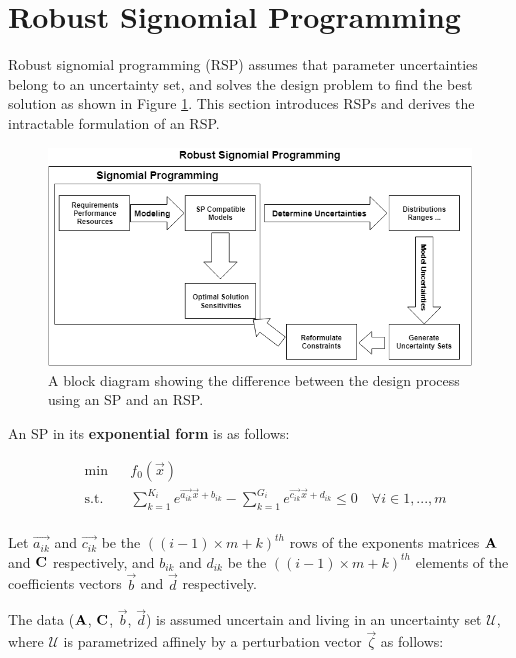 \section{Robust Signomial Programming} \label{RSP}
Robust signomial programming (RSP) assumes that parameter uncertainties belong to an uncertainty set, and solves the design problem to find the best solution as shown in Figure \ref{block_diag}. This section introduces RSPs and derives the intractable formulation of an RSP.

\begin{figure}[h]
	\centering
	\includegraphics{figures/RSP_Diagram.png}
	\caption{A block diagram showing the difference between the design process using an SP and an RSP.}
	\label{block_diag}
\end{figure}

An SP in its \textbf{exponential form} is as follows:

\begin{equation}
\begin{aligned}
	& \min && f_0\left(\vec{x}\right) \\
	& \text{s.t.} && \textstyle{\sum}_{k=1}^{K_i}e^{\vec{a_{ik}}\vec{x} + b_{ik}} - \textstyle{\sum}_{k=1}^{G_i}e^{\vec{c_{ik}}\vec{x} + d_{ik}} \leq 0 \quad \forall i \in 1,...,m\\
\end{aligned}
\label{SP_exponential}
\end{equation}

Let $\vec{a_{ik}}$ and $\vec{c_{ik}}$ be the $((i-1)\times m + k)^{th}$ rows of the exponents matrices $\mathbf{A}$ and $\mathbf{C}$ respectively, and $b_{ik}$ and $d_{ik}$ be the $((i-1)\times m + k)^{th}$ elements of the coefficients vectors $\vec{b}$ and $\vec{d}$ respectively.

The data ($\mathbf{A}$, $\mathbf{C}$, $\vec{b}$, $\vec{d}$) is assumed uncertain and living in an uncertainty set $\mathcal{U}$, where $\mathcal{U}$ is parametrized affinely by a perturbation vector $\vec{\zeta}$ as follows:

